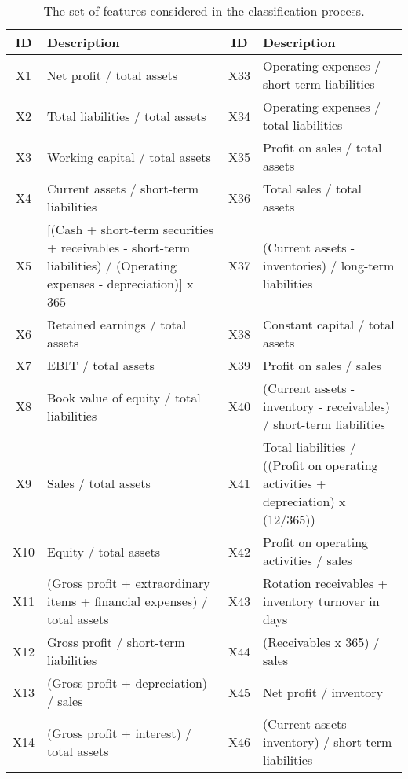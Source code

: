\documentclass{article}      %
\begin{document}
\begin{table}[!h]
    \centering
    \caption{The set of features considered in the classification process.}
    \small  %
    \begin{tabular}{|c|p{6.5cm}|c|p{6.5cm}|}
    \arrayrulecolor{black}  %
    \toprule
    \textbf{ID} & \textbf{Description} & \textbf{ID} & \textbf{Description} \\
    \midrule
    \arrayrulecolor{lightgray}
    X1  & Net profit / total assets & X33 & Operating expenses / short-term liabilities \\
    \hline
    X2  & Total liabilities / total assets & X34 & Operating expenses / total liabilities \\
    \hline
    X3  & Working capital / total assets & X35 & Profit on sales / total assets \\
    \hline
    X4  & Current assets / short-term liabilities & X36 & Total sales / total assets \\
    \hline
    X5  & [(Cash + short-term securities + receivables - short-term liabilities) / (Operating expenses - depreciation)] x 365 & X37 & (Current assets - inventories) / long-term liabilities \\
    \hline
    X6  & Retained earnings / total assets & X38 & Constant capital / total assets \\
    \hline
    X7  & EBIT / total assets & X39 & Profit on sales / sales \\
    \hline
    X8  & Book value of equity / total liabilities & X40 & (Current assets - inventory - receivables) / short-term liabilities \\
    \hline
    X9  & Sales / total assets & X41 & Total liabilities / ((Profit on operating activities + depreciation) x (12/365)) \\
    \hline
    X10 & Equity / total assets & X42 & Profit on operating activities / sales \\
    \hline
    X11 & (Gross profit + extraordinary items + financial expenses) / total assets & X43 & Rotation receivables + inventory turnover in days \\
    \hline
    X12 & Gross profit / short-term liabilities & X44 & (Receivables x 365) / sales \\
    \hline
    X13 & (Gross profit + depreciation) / sales & X45 & Net profit / inventory \\
    \hline
    X14 & (Gross profit + interest) / total assets & X46 & (Current assets - inventory) / short-term liabilities \\

\end{tabular}
\end{table}
\end{document}
